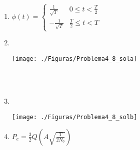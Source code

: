 \documentclass[idioma,boletin]{uah}
\begin{document}
{

\begin{enumerate}
	\item $\phi(t) = \left \{ \begin{array}{ll} \frac{1}{\sqrt{T}} & 0 \leq t < \frac{T}{2} \\  -\frac{1}{\sqrt{T}} & \frac{T}{2} \leq t < T \end{array} \right.$
	
	\item \ \\
	\begin{figure*}[h!] \centering\texttt{[image: ./Figuras/Problema4\_8\_sola]}	\end{figure*}
	
	\ \\
	\ \\
	\item \ \\
	\begin{figure*}[h!] 	\centering\texttt{[image: ./Figuras/Problema4\_8\_solb]} 	\end{figure*}
	
	\item $P_e = \frac{3}{2} Q \left ( A \sqrt{\frac{T}{2N_0}} \right ) $
	
\end{enumerate}

}
\end{document}
